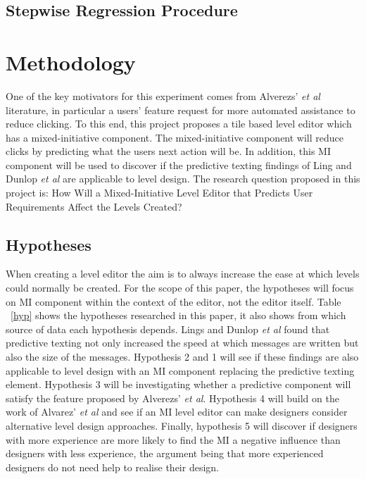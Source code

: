 \documentclass[journal]{IEEEtran}
\begin{document}
\subsection{Stepwise Regression Procedure}

\section{Methodology}
One of the key motivators for this experiment comes from Alverezs' \textit{et al}\cite{alvarez2018fostering} literature, in particular a users' feature request for more automated assistance to reduce clicking. To this end, this project proposes a tile based level editor which has a mixed-initiative component. The mixed-initiative component will reduce clicks by predicting what the users next action will be. In addition, this MI component will be used to discover if the predictive texting findings of Ling \cite{ling2005length}  and Dunlop \textit{et al}\cite{dunlop2000predictive} are applicable to level design. The research question proposed in this project is: How Will a Mixed-Initiative Level Editor that Predicts User Requirements Affect the Levels Created? 

\subsection{Hypotheses}\label{Hypotheses}
When creating a level editor the aim is to always increase the ease at which levels could normally be created. For the scope of this paper, the hypotheses will focus on MI component within the context of the editor, not the editor itself. Table ~\ref{hyp} shows the hypotheses researched in this paper, it also shows from which source of data each hypothesis depends. Lings \cite{ling2005length}  and Dunlop \textit{et al}\cite{dunlop2000predictive} found that predictive texting not only increased the speed at which messages are written but also the size of the messages. Hypothesis 2 and 1 will see if these findings are also applicable to level design with an MI component replacing the predictive texting element.  Hypothesis 3 will be investigating whether a predictive component will satisfy the feature proposed by  Alverezs' \textit{et al}\cite{alvarez2018fostering}. Hypothesis 4 will build on the work of  Alvarez' \textit{et al}\cite{alvarez2018fostering} and see if an MI level editor can make designers consider alternative level design approaches. Finally, hypothesis 5 will discover if designers with more experience are more likely to find the MI a negative influence than designers with less experience, the argument being that more experienced designers do not need help to realise their design.
\end{document}
